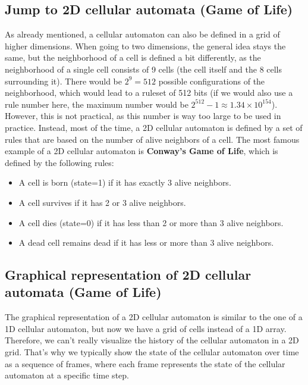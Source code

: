 \documentclass[a4paper,12pt]{llncs}
\numberwithin{equation}{section}
\begin{document}
\subsection{Jump to 2D cellular automata (Game of Life)}
As already mentioned, a cellular automaton can also be defined in a grid of higher dimensions.
When going to two dimensions, the general idea stays the same, but the neighborhood of a cell is defined a bit differently, as the neighborhood of a single cell consists of 9 cells (the cell itself and the 8 cells surrounding it).
There would be $2^9=512$ possible configurations of the neighborhood, which would lead to a ruleset of 512 bits (if we would also use a rule number here, the maximum number would be $2^{512} - 1 \approx 1.34 \times 10^{154}$).
However, this is not practical, as this number is way too large to be used in practice.
Instead, most of the time, a 2D cellular automaton is defined by a set of rules that are based on the number of alive neighbors of a cell.
The most famous example of a 2D cellular automaton is \textbf{Conway's Game of Life}, which is defined by the following rules:
\begin{itemize}
  \item A cell is born (state=1) if it has exactly 3 alive neighbors.
  \item A cell survives if it has 2 or 3 alive neighbors.
  \item A cell dies (state=0) if it has less than 2 or more than 3 alive neighbors.
  \item A dead cell remains dead if it has less or more than 3 alive neighbors.
\end{itemize}
\subsection{Graphical representation of 2D cellular automata (Game of Life)}
\label{sec:cellular-automata-graphical-2d}
The graphical representation of a 2D cellular automaton is similar to the one of a 1D cellular automaton, but now we have a grid of cells instead of a 1D array.
Therefore, we can't really visualize the history of the cellular automaton in a 2D grid.
That's why we typically show the state of the cellular automaton over time as a sequence of frames, where each frame represents the state of the cellular automaton at a specific time step.
\end{document}
